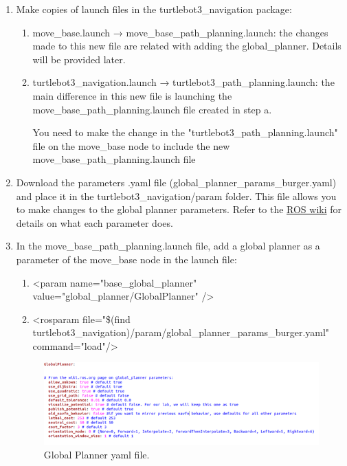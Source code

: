 \documentclass[12pt]{article}
\begin{document}

\begin{enumerate}
    \item Make copies of launch files in the turtlebot3\_navigation package:
    \begin{enumerate}
        \item move\_base.launch → move\_base\_path\_planning.launch: the changes made to this new file are related with adding the global\_planner. Details will be provided later.
        \item turtlebot3\_navigation.launch → turtlebot3\_path\_planning.launch: the main difference in this new file is launching the move\_base\_path\_planning.launch file created in step a.
       
       You need to make the change in the "turtlebot3\_path\_planning.launch" file on the move\_base node to include the new move\_base\_path\_planning.launch file


    \end{enumerate}
    \item Download the parameters .yaml file (global\_planner\_params\_burger.yaml) and place it in the turtlebot3\_navigation/param folder. This file allows you to make changes to the global planner parameters. Refer to the \href{http://wiki.ros.org/global\_planner}{ROS wiki} for details on what each parameter does.
    
    \item In the move\_base\_path\_planning.launch file, add a global planner as a parameter of the move\_base node in the launch file:
    \begin{enumerate}
    \item <param name="base\_global\_planner" value="global\_planner/GlobalPlanner" />
    
    \item <rosparam file="\$(find turtlebot3\_navigation)/param/global\_planner\_params\_burger.yaml" command="load"/>

    \end{enumerate}
    \begin{figure}[H]
    \vspace{-10pt}
    \centering\includegraphics[width=14cm]{images/globalPlanner.png}\vspace{-10pt}
    \caption{Global Planner yaml file.}\label{fig:pid}
    \end{figure}
    
    \end{enumerate}
\end{document}
